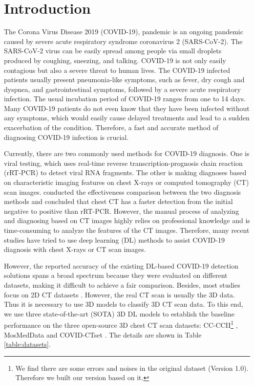 \documentclass[letterpaper]{article}
\begin{document}
\section{Introduction}
The Corona Virus Disease 2019 (COVID-19), pandemic is an ongoing pandemic caused by severe acute respiratory syndrome coronavirus 2 (SARS-CoV-2). The SARS-CoV-2 virus can be easily spread among people via small droplets produced by coughing, sneezing, and talking. COVID-19 is not only easily contagious but also a severe threat to human lives. The COVID-19 infected patients usually present pneumonia-like symptoms, such as fever, dry cough and dyspnea, and gastrointestinal symptoms, followed by a severe acute respiratory infection. The usual incubation period of COVID-19 ranges from one to 14 days. Many COVID-19 patients do not even know that they have been infected without any symptoms, which would easily cause delayed treatments and lead to a sudden exacerbation of the condition. Therefore, a fast and accurate method of diagnosing COVID-19 infection is crucial.

Currently, there are two commonly used methods for COVID-19 diagnosis. One is viral testing, which uses real-time reverse transcription-prognosis chain reaction (rRT-PCR) to detect viral RNA fragments. The other is making diagnoses based on characteristic imaging features on chest X-rays or computed tomography (CT) scan images. \cite{corr_ct_pcr} conducted the effectiveness comparison between the two diagnosis methods and concluded that chest CT has a faster detection from the initial negative to positive than rRT-PCR. However, the manual process of analyzing and diagnosing based on CT images highly relies on professional knowledge and is time-consuming to analyze the features of the CT images. Therefore, many recent studies have tried to use deep learning (DL) methods to assist COVID-19 diagnosis with chest X-rays or CT scan images.

However, the reported accuracy of the existing DL-based COVID-19 detection solutions spans a broad spectrum because they were evaluated on different datasets, making it difficult to achieve a fair comparison. Besides, most studies focus on 2D CT datasets \cite{Singh2020,Ardakani2020,Alom}. However, the real CT scan is usually the 3D data. Thus it is necessary to use 3D models to classify 3D CT scan data. To this end, we use three state-of-the-art (SOTA) 3D DL models to establish the baseline performance on the three open-source 3D chest CT scan datasets:  CC-CCII\footnote{We find there are some errors and noises in the original dataset (Version 1.0). Therefore we built our version based on it.} \cite{cell_covid}, MosMedData \cite{mosmeddata} and COVID-CTset \cite{covid-ctset}. The details are shown in Table \ref{table:datasets}.
\end{document}
